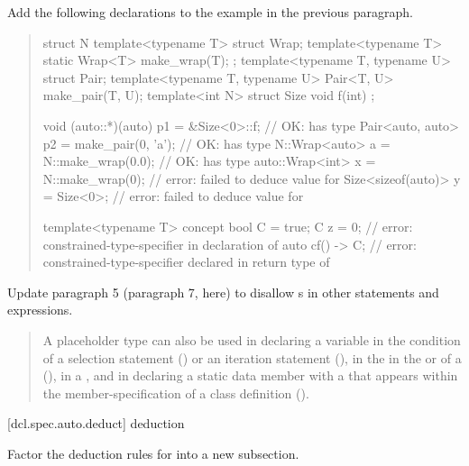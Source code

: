 Add the following declarations to the example in the previous paragraph.

\begin{quote}
\begin{codeblock}
struct N {
  template<typename T> struct Wrap;
  template<typename T> static Wrap<T> make_wrap(T);
};
template<typename T, typename U> struct Pair;
template<typename T, typename U> Pair<T, U> make_pair(T, U);
template<int N> struct Size { void f(int) { }  };

void (auto::*)(auto) p1 = &Size<0>::f;   // OK:  has type 
Pair<auto, auto> p2 = make_pair(0, 'a'); // OK:  has type 
N::Wrap<auto> a = N::make_wrap(0.0);     // OK:  has type 
auto::Wrap<int> x = N::make_wrap(0);     // error: failed to deduce value for 
Size<sizeof(auto)> y = Size<0>{};        // error: failed to deduce value for 

template<typename T> concept bool C = true;
C z = 0;        // error: constrained-type-specifier in declaration of 
auto cf() -> C; // error: constrained-type-specifier declared in return type of 
\end{codeblock}
\end{quote}


Update paragraph 5 (paragraph 7, here) to disallow 
s in other statements 
and expressions.

\begin{quote}
\pnum
A placeholder type can also be used in declaring a variable in the 
condition of a selection statement () or an iteration 
statement (), in the  in the 
 or  of a 
(), in a , and in declaring a 
static data member with a  that appears
within the member-specification of a class definition ().
% 
\end{quote}

[dcl.spec.auto.deduct]{ deduction}

Factor the deduction rules for  into a new subsection.

